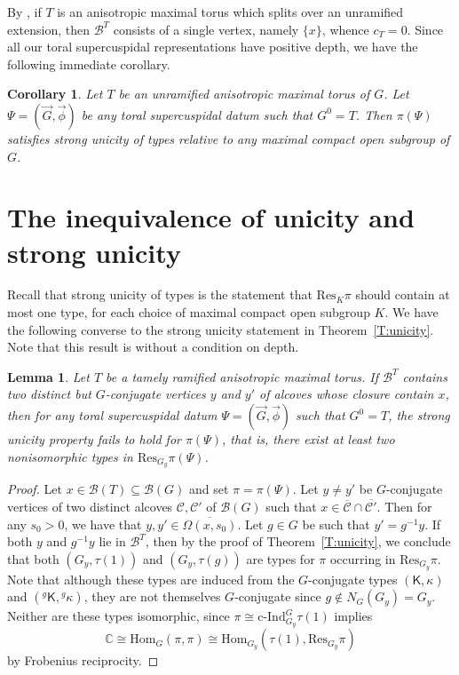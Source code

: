 \documentclass[12pt]{amsart}
\newcommand{\Res}{\mathrm{Res}} %
\newcommand{\cind}{\textrm{c-}\mathrm{Ind}} %
\newcommand{\Hom}{\mathrm{Hom}}
\newcommand{\Bset}{\Omega}
\newcommand{\buil}{\mathcal{B}}
\newcommand{\C}{\mathcal{C}} %
\newcommand{\KT}{\mathsf{K}}
\theoremstyle{plain}
\newtheorem{lemma}[theorem]{Lemma}
\newtheorem{cor}[theorem]{Corollary}
\theoremstyle{definition}
\theoremstyle{remark}
\numberwithin{equation}{section}
\numberwithin{figure}{section}
\begin{document}
By \cite[3.6.1]{Tits1979}, if $T$ is an anisotropic maximal  torus which splits over an unramified extension, then $\buil^T$ consists of a single vertex, namely $\{x\}$, whence $c_T=0$.  Since all our toral supercuspidal representations have positive depth, we have the following immediate corollary.

\begin{cor}\label{C:unramified}
Let $T$ be an \emph{unramified}  anisotropic maximal torus of $G$.  Let $\Psi = (\vec{G},\vec{\phi})$ be any toral supercuspidal datum such that $G^0=T$.  Then $\pi(\Psi)$ satisfies  strong unicity of types relative to any maximal compact open subgroup of $G$.  
\end{cor}


\section{The inequivalence of unicity and strong unicity}\label{S:nonunicity}

Recall that strong unicity of types is the statement that $\Res_{K}\pi$ should contain at most one type, for each choice of maximal compact open subgroup $K$.   We have the following converse to the strong unicity statement in Theorem~\ref{T:unicity}.  Note that this result is without a condition on depth.

\begin{lemma}\label{L:strongunicityfails}
Let $T$ be a tamely ramified anisotropic maximal  torus.  If $\buil^T$ contains two distinct but $G$-conjugate vertices $y$ and $y'$ of alcoves whose closure contain $x$, then for any toral supercuspidal datum $\Psi = (\vec{G},\vec{\phi})$ such that $G^0=T$, the strong unicity property fails to hold for $\pi(\Psi)$, that is, there exist at least two nonisomorphic types in $\Res_{G_y}\pi(\Psi)$.
\end{lemma}

\begin{proof}
Let $x \in \buil(T) \subseteq \buil(G)$ and set $\pi=\pi(\Psi)$.  Let  $y\neq y'$ be $G$-conjugate vertices of two distinct alcoves $\C, \C'$ of $\buil(G)$ such that $x \in \overline{\C}\cap \overline{\C'}$.  Then for any $s_0>0$, we have that $y,y' \in \overline{\Bset(x,s_0)}$.  Let $g \in G$ be such that $y'=g^{-1}y$.  If both $y$ and $g^{-1}y$ lie in $\buil^T$, then by the proof of Theorem~\ref{T:unicity}, we conclude that both $(G_y,\tau(1))$ and $(G_{y},\tau(g))$ are types for $\pi$ occurring in $\Res_{G_y}\pi$.  Note that although these types are induced from the $G$-conjugate types $(\KT,\kappa)$ and $({}^g\KT,{}^g\kappa)$, they are not themselves $G$-conjugate since $g\notin N_G(G_y)=G_y$.
Neither are these types isomorphic, since $\pi \cong \cind_{G_y}^G\tau(1)$ implies
$$
\mathbb{C}\cong\Hom_{G}(\pi,\pi) \cong \Hom_{G_y}(\tau(1),\Res_{G_y}\pi)
$$
by Frobenius reciprocity.
\end{proof}
\end{document}
